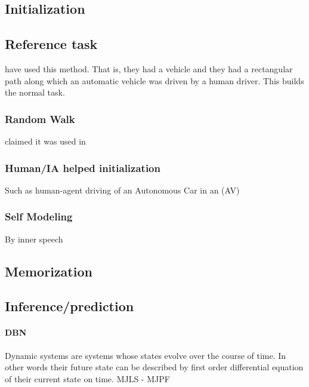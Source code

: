 \documentclass{article}
\begin{document}
		\subsection{Initialization}
			\subsection{Reference task} \cite{regazzoni-2020-multi-sensorial-generative-and-descriptive-self-awareness-models-for-autonomous-systems,kanapram-2019-dynamic-bayesian-approach-for-decision-making-in-ego-things,kanapram-2019-self-awareness-in-intelligent-vehicles-experience-based-abnormality-detection,kanapram-2020-collective-awareness-for-abnormality-detection-in-connected-autonomous-vehicles,baydoun-2018-learning-switching-models-for-abnormality-detection-for-autonomous-driving} have used this method. That is, they had a vehicle and they had a rectangular path along which an automatic vehicle was driven by a human driver. This builds the normal task. 
			\subsubsection{Random Walk} \cite{regazzoni-2020-multi-sensorial-generative-and-descriptive-self-awareness-models-for-autonomous-systems} claimed it was used in \citep{kanapram-2019-dynamic-bayesian-approach-for-decision-making-in-ego-things}
			\subsubsection{Human/IA helped initialization} Such as human-agent driving of an Autonomous Car in an (AV)
			\subsubsection{Self Modeling}
			\citet{bellman-2017-self-modeling-and-self-awareness}
			\citet{kwiatkowski-2019-zero-shot-learning-on-simulated-robots}	
			\citet{kwiatkowski-2019-task-agnostic-self-modeling-machines}
			By inner speech \cite{chella-2020-developing-self-awareness-in-robots-via-inner-speech}
		\subsection{Memorization}
		\subsection{Inference/prediction}
			\paragraph{DBN} 
			Dynamic systems are systems whose states evolve over the course of time. In other words their future state can be described by first order differential equation of their current state on time. MJLS - MJPF \citep{baydoun-2018-learning-switching-models-for-abnormality-detection-for-autonomous-driving}
\end{document}
